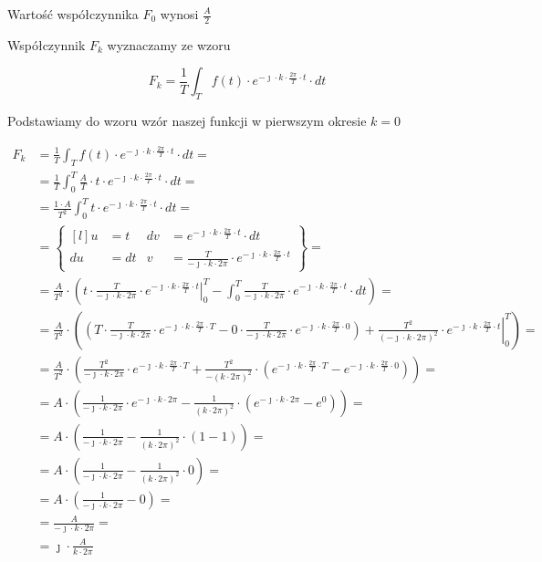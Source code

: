 \begin{task}
Wartość współczynnika $F_0$ wynosi $\frac{A}{2}$

Współczynnik $F_k$ wyznaczamy ze wzoru

\begin{equation}
F_k=\frac{1}{T}\int_{T}f(t) \cdot e^{ -\jmath \cdot k \cdot \frac{2\pi}{T} \cdot t} \cdot dt
\end{equation}

Podstawiamy do wzoru wzór naszej funkcji w pierwszym okresie $k=0$

\begin{align*}
F_k&=\frac{1}{T}\int_{T}f(t) \cdot e^{ -\jmath \cdot k \cdot \frac{2\pi}{T} \cdot t} \cdot dt=\\
&=\frac{1}{T}\int_{0}^{T} \frac{A}{T} \cdot t \cdot e^{ -\jmath \cdot k \cdot \frac{2\pi}{T} \cdot t} \cdot dt=\\
&=\frac{1\cdot A}{T^2}\int_{0}^{T} t \cdot e^{ -\jmath \cdot k \cdot \frac{2\pi}{T} \cdot t} \cdot dt=\\
&=\begin{Bmatrix*}[l]
u&=t & dv&=e^{ -\jmath \cdot k \cdot \frac{2\pi}{T} \cdot t} \cdot dt \\
du&=dt & v&=\frac{T}{-\jmath \cdot k\cdot 2\pi}\cdot e^{ -\jmath \cdot k \cdot \frac{2\pi}{T} \cdot t}
\end{Bmatrix*}=\\
&=\frac{A}{T^2}\cdot \left( \left. t \cdot \frac{T}{-\jmath \cdot k\cdot 2\pi}\cdot e^{ -\jmath \cdot k \cdot \frac{2\pi}{T} \cdot t} \right|_{0}^{T} - \int_{0}^{T}  \frac{T}{-\jmath \cdot k\cdot 2\pi}\cdot e^{ -\jmath \cdot k \cdot \frac{2\pi}{T} \cdot t} \cdot dt \right)=\\
&=\frac{A}{T^2}\cdot \left( \left( T \cdot \frac{T}{-\jmath \cdot k\cdot 2\pi}\cdot e^{ -\jmath \cdot k \cdot \frac{2\pi}{T} \cdot T} - 0 \cdot \frac{T}{-\jmath \cdot k\cdot 2\pi}\cdot e^{ -\jmath \cdot k \cdot \frac{2\pi}{T} \cdot 0} \right) + \left.  \frac{T^2}{\left(-\jmath \cdot k\cdot 2\pi\right)^2}\cdot e^{ -\jmath \cdot k \cdot \frac{2\pi}{T} \cdot t} \right|_{0}^{T} \right)=\\
&=\frac{A}{T^2}\cdot \left(\frac{T^2}{-\jmath \cdot k\cdot 2\pi}\cdot e^{ -\jmath \cdot k \cdot \frac{2\pi}{T} \cdot T} + \frac{T^2}{- \left(k\cdot 2\pi\right)^2}\cdot \left( e^{ -\jmath \cdot k \cdot \frac{2\pi}{T} \cdot T} - e^{ -\jmath \cdot k \cdot \frac{2\pi}{T} \cdot 0} \right) \right)=\\
&=A\cdot \left(\frac{1}{-\jmath \cdot k\cdot 2\pi}\cdot e^{ -\jmath \cdot k \cdot 2\pi} - \frac{1}{\left(k\cdot 2\pi\right)^2}\cdot \left(e^{ -\jmath \cdot k \cdot 2\pi} -e^{ 0} \right) \right)=\\
&=A\cdot \left(\frac{1}{-\jmath \cdot k\cdot 2\pi} - \frac{1}{\left(k\cdot 2\pi\right)^2}\cdot \left( 1 - 1 \right) \right)=\\
&=A\cdot \left(\frac{1}{-\jmath \cdot k\cdot 2\pi} - \frac{1}{\left(k\cdot 2\pi\right)^2}\cdot 0 \right)=\\
&=A\cdot \left(\frac{1}{-\jmath \cdot k\cdot 2\pi} - 0\right)=\\
&=\frac{A}{-\jmath \cdot k\cdot 2\pi}=\\
&=\jmath \cdot \frac{A}{k\cdot 2\pi}
\end{align*}


\end{task}
